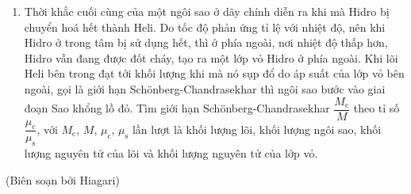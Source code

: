 \begin{enumerate}[resume]
    
    \item Thời khắc cuối cùng của một ngôi sao ở dãy chính diễn ra khi mà Hidro bị chuyển hoá hết thành Heli. Do tốc độ phản ứng tỉ lệ với nhiệt độ, nên khi Hidro ở trong tâm bị sử dụng hết, thì ở phía ngoài, nơi nhiệt độ thấp hơn, Hidro vẫn đang được đốt cháy, tạo ra một lớp vỏ Hidro ở phía ngoài. Khi lõi Heli bên trong đạt tới khối lượng khi mà nó sụp đổ do áp suất của lớp vỏ bên ngoài, gọi là giới hạn Schönberg-Chandrasekhar thì ngôi sao bước vào giai đoạn Sao khổng lồ đỏ. Tìm giới hạn Schönberg-Chandrasekhar $\dfrac{M_\text{c}}{M}$ theo tỉ số $\dfrac{\mu_\text{c}}{\mu_\text{s}}$, với $M_\text{c}$, $M$, $\mu_\text{c}$, $\mu_\text{s}$ lần lượt là khối lượng lõi, khối lượng ngôi sao, khối lượng nguyên tử của lõi và khối lượng nguyên tử của lớp vỏ.  
\end{enumerate}

\begin{flushright}
    (Biên soạn bởi Hiagari)
\end{flushright}